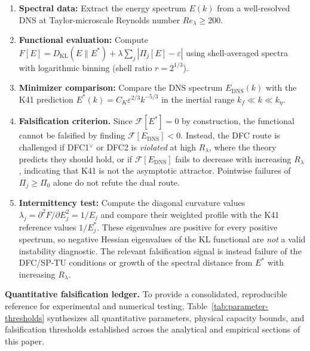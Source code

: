 \documentclass[12pt,a4paper]{article}
\theoremstyle{breakdef}
\theoremstyle{breakplain}
\theoremstyle{breakdef}
\begin{document}
\begin{enumerate}
\item \textbf{Spectral data:} Extract the energy spectrum $E(k)$ from a well-resolved DNS at Taylor-microscale Reynolds number $Re_\lambda \geq 200$.

\item \textbf{Functional evaluation:} Compute $F[E] = D_{\mathrm{KL}}(E \| E^*) + \lambda \sum_j |\Pi_j[E] - \varepsilon|$ using shell-averaged spectra with logarithmic binning (shell ratio $r = 2^{1/3}$).

\item \textbf{Minimizer comparison:} Compare the DNS spectrum $E_{\mathrm{DNS}}(k)$ with the K41 prediction $E^*(k) = C_K \varepsilon^{2/3} k^{-5/3}$ in the inertial range $k_f \ll k \ll k_\eta$.

\item \textbf{Falsification criterion.}
  Since $\mathcal{F}[E^*] = 0$ by construction, the functional cannot be
  falsified by finding $\mathcal{F}[E_{\mathrm{DNS}}] < 0$. Instead, the
  DFC route is challenged if DFC1$^\vee$ or DFC2 is \emph{violated} at
  high $R_\lambda$, where the theory predicts they should hold, or if
  $\mathcal{F}[E_{\mathrm{DNS}}]$ fails to decrease with increasing
  $R_\lambda$, indicating that K41 is not the asymptotic attractor.
  Pointwise failures of $\Pi_j\ge\Pi_0$ alone do not refute the dual
  route.

\item \textbf{Intermittency test:} Compute the diagonal curvature values
  $\lambda_j=\partial^2F/\partial E_j^2=1/E_j$ and compare their weighted
  profile with the K41 reference values $1/E_j^*$. These eigenvalues are
  positive for every positive spectrum, so negative Hessian eigenvalues of
  the KL functional are \emph{not} a valid instability diagnostic. The
  relevant falsification signal is instead failure of the DFC/SP-TU
  conditions or growth of the spectral distance from $E^*$ with increasing
  $R_\lambda$.
\end{enumerate}

\medskip\noindent
\textbf{Quantitative falsification ledger.}\quad
To provide a consolidated, reproducible reference for experimental and numerical testing, Table~\ref{tab:parameter-thresholds} synthesizes all quantitative parameters, physical capacity bounds, and falsification thresholds established across the analytical and empirical sections of this paper.
\end{document}
